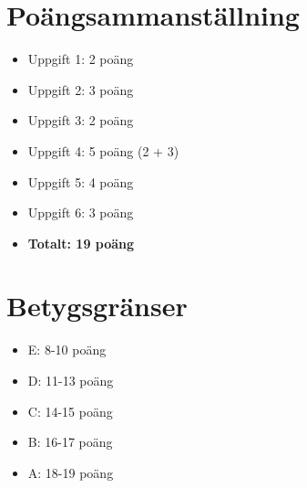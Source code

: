 \documentclass[12pt,a4paper]{article}
\begin{document}
\section*{Poängsammanställning}
\begin{itemize}
    \item Uppgift 1: 2 poäng
    \item Uppgift 2: 3 poäng
    \item Uppgift 3: 2 poäng
    \item Uppgift 4: 5 poäng (2 + 3)
    \item Uppgift 5: 4 poäng
    \item Uppgift 6: 3 poäng
    \item \textbf{Totalt: 19 poäng}
\end{itemize}

\section*{Betygsgränser}
\begin{itemize}
    \item E: 8-10 poäng
    \item D: 11-13 poäng
    \item C: 14-15 poäng
    \item B: 16-17 poäng
    \item A: 18-19 poäng
\end{itemize}
\end{document}

